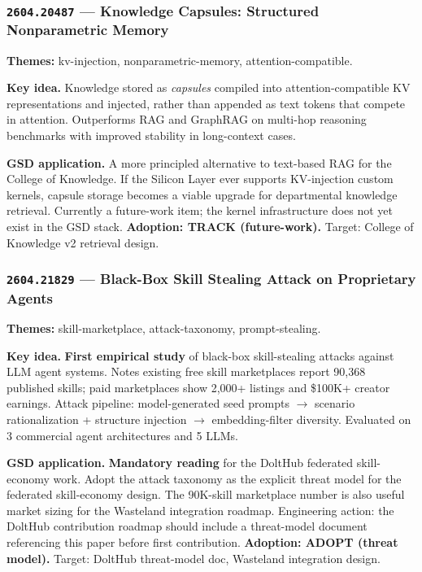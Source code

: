 \documentclass[11pt,letterpaper]{article}
\newcommand{\arxivid}[1]{\texttt{\textcolor{accent}{#1}}}
\newcommand{\paperhead}[2]{\noindent\textbf{\sffamily\textcolor{secondary}{#1}} \textemdash{} #2}
\begin{document}
\subsubsection{\arxivid{2604.20487} --- Knowledge Capsules: Structured Nonparametric Memory}

\paperhead{Themes:}{kv-injection, nonparametric-memory, attention-compatible.}

\textbf{Key idea.} Knowledge stored as \textit{capsules} compiled into attention-compatible KV representations and injected, rather than appended as text tokens that compete in attention. Outperforms RAG and GraphRAG on multi-hop reasoning benchmarks with improved stability in long-context cases.

\textbf{GSD application.} A more principled alternative to text-based RAG for the College of Knowledge. If the Silicon Layer ever supports KV-injection custom kernels, capsule storage becomes a viable upgrade for departmental knowledge retrieval. Currently a future-work item; the kernel infrastructure does not yet exist in the GSD stack. \textbf{Adoption: TRACK (future-work).} Target: College of Knowledge v2 retrieval design.

\subsubsection{\arxivid{2604.21829} --- Black-Box Skill Stealing Attack on Proprietary Agents}

\paperhead{Themes:}{skill-marketplace, attack-taxonomy, prompt-stealing.}

\textbf{Key idea.} \textbf{First empirical study} of black-box skill-stealing attacks against LLM agent systems. Notes existing free skill marketplaces report 90,368 published skills; paid marketplaces show 2,000+ listings and \$100K+ creator earnings. Attack pipeline: model-generated seed prompts $\to$ scenario rationalization + structure injection $\to$ embedding-filter diversity. Evaluated on 3 commercial agent architectures and 5 LLMs.

\textbf{GSD application.} \textbf{Mandatory reading} for the DoltHub federated skill-economy work. Adopt the attack taxonomy as the explicit threat model for the federated skill-economy design. The 90K-skill marketplace number is also useful market sizing for the Wasteland integration roadmap. Engineering action: the DoltHub contribution roadmap should include a threat-model document referencing this paper before first contribution. \textbf{Adoption: ADOPT (threat model).} Target: DoltHub threat-model doc, Wasteland integration design.
\end{document}
